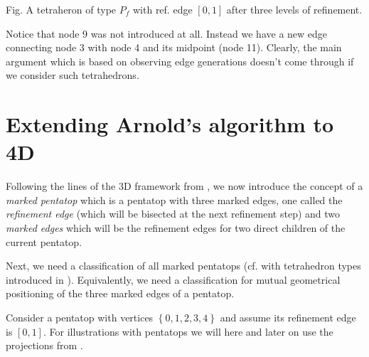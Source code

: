 \documentclass[a4paper,12pt]{amsart}
\numberwithin{equation}{section}
\begin{document}
\begin{minipage}[]{0.5\textwidth}
\begin{center}
\newline
Fig. A tetraheron of type $P_f$ with ref. edge $[0,1]$ after three levels of refinement.
\end{center}
\end{minipage}

\vspace{1.0em}
Notice that node 9 was not introduced at all. Instead we have a new edge connecting node 3 with node 4 and its midpoint (node 11). Clearly, the main argument which is based on observing edge generations doesn't come through if we consider such tetrahedrons.


\section{Extending Arnold's algorithm to 4D}

Following the lines of the 3D framework from \cite{arnold}, we now introduce the concept of a \textit{marked pentatop} which is a pentatop with three marked edges, one called the \textit{refinement edge} (which will be bisected at the next refinement step) and two \textit{marked edges} which will be the refinement edges for two direct children of the current pentatop.

Next, we need a classification of all marked pentatops (cf. with tetrahedron types introduced in \cite{arnold}). Equivalently, we need a classification for mutual geometrical positioning of the three marked edges of a pentatop.

Consider a pentatop with vertices $\left\{ 0,1,2,3,4 \right\}$ and assume its refinement edge is $[0,1]$. For illustrations with pentatops we will here and later on use the projections from \cite{neu_ste}.
\end{document}
